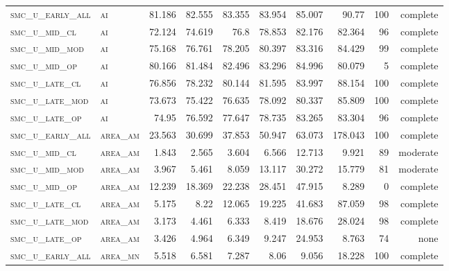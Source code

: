 \begin{landscape}
\begin{center}
\begin{footnotesize}
\begin{longtable}{llrrrrr|rrr}
\textsc{smc\_u\_early\_all} & \textsc{ai        }   & 81.186   & 82.555   & 83.355   & 83.954   & 85.007   & 90.77    & 100 & complete \\
\textsc{smc\_u\_mid\_cl   } & \textsc{ai        }   & 72.124   & 74.619   & 76.8     & 78.853   & 82.176   & 82.364   & 96  & complete \\
\textsc{smc\_u\_mid\_mod  } & \textsc{ai        }   & 75.168   & 76.761   & 78.205   & 80.397   & 83.316   & 84.429   & 99  & complete \\
\textsc{smc\_u\_mid\_op   } & \textsc{ai        }   & 80.166   & 81.484   & 82.496   & 83.296   & 84.996   & 80.079   & 5   & complete \\
\textsc{smc\_u\_late\_cl  } & \textsc{ai        }   & 76.856   & 78.232   & 80.144   & 81.595   & 83.997   & 88.154   & 100 & complete \\
\textsc{smc\_u\_late\_mod } & \textsc{ai        }   & 73.673   & 75.422   & 76.635   & 78.092   & 80.337   & 85.809   & 100 & complete \\
\textsc{smc\_u\_late\_op  } & \textsc{ai        }   & 74.95    & 76.592   & 77.647   & 78.735   & 83.265   & 83.304   & 96  & complete \\
\textsc{smc\_u\_early\_all} & \textsc{area\_am  }   & 23.563   & 30.699   & 37.853   & 50.947   & 63.073   & 178.043  & 100 & complete \\
\textsc{smc\_u\_mid\_cl   } & \textsc{area\_am  }   & 1.843    & 2.565    & 3.604    & 6.566    & 12.713   & 9.921    & 89  & moderate \\
\textsc{smc\_u\_mid\_mod  } & \textsc{area\_am  }   & 3.967    & 5.461    & 8.059    & 13.117   & 30.272   & 15.779   & 81  & moderate \\
\textsc{smc\_u\_mid\_op   } & \textsc{area\_am  }   & 12.239   & 18.369   & 22.238   & 28.451   & 47.915   & 8.289    & 0   & complete \\
\textsc{smc\_u\_late\_cl  } & \textsc{area\_am  }   & 5.175    & 8.22     & 12.065   & 19.225   & 41.683   & 87.059   & 98  & complete \\
\textsc{smc\_u\_late\_mod } & \textsc{area\_am  }   & 3.173    & 4.461    & 6.333    & 8.419    & 18.676   & 28.024   & 98  & complete \\
\textsc{smc\_u\_late\_op  } & \textsc{area\_am  }   & 3.426    & 4.964    & 6.349    & 9.247    & 24.953   & 8.763    & 74  & none     \\
\textsc{smc\_u\_early\_all} & \textsc{area\_mn  }   & 5.518    & 6.581    & 7.287    & 8.06     & 9.056    & 18.228   & 100 & complete \\

\end{longtable}
\end{footnotesize}
\end{center}
\end{landscape}
